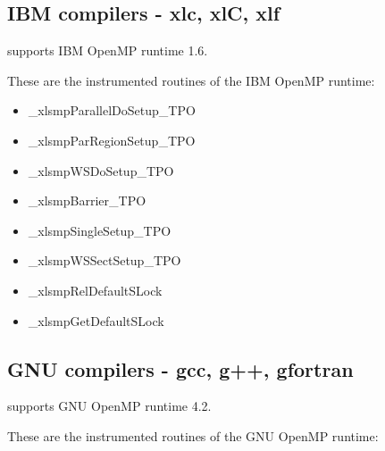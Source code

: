 \subsection{IBM compilers - xlc, xlC, xlf}

\TRACE supports IBM OpenMP runtime 1.6.

These are the instrumented routines of the IBM OpenMP runtime:

\begin{itemize}
\item \_xlsmpParallelDoSetup\_TPO
\item \_xlsmpParRegionSetup\_TPO
\item \_xlsmpWSDoSetup\_TPO
\item \_xlsmpBarrier\_TPO
\item \_xlsmpSingleSetup\_TPO
\item \_xlsmpWSSectSetup\_TPO
\item \_xlsmpRelDefaultSLock\footnotemark[4]
\item \_xlsmpGetDefaultSLock\footnotemark[4]
\end{itemize}

\subsection{GNU compilers - gcc, g++, gfortran}

\TRACE supports GNU OpenMP runtime 4.2.

These are the instrumented routines of the GNU OpenMP runtime:

